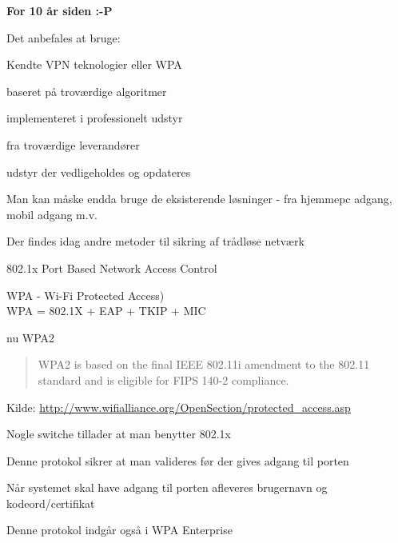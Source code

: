 \documentclass[Screen16to9,17pt]{foils}
\begin{document}
\centerline{\bf For 10 år siden :-P }


\begin{list1}
\item Det anbefales at bruge:
\item Kendte VPN teknologier eller WPA
\item baseret på troværdige algoritmer
\item implementeret i professionelt udstyr
\item fra troværdige leverandører
\item udstyr der vedligeholdes og opdateres
\item Man kan måske endda bruge de eksisterende løsninger - fra
  hjemmepc adgang, mobil adgang m.v.
\end{list1}




\begin{list1}
\item Der findes idag andre metoder til sikring af trådløse netværk
\item 802.1x Port Based Network Access Control
\item WPA - Wi-Fi Protected Access)\\
WPA = 802.1X + EAP + TKIP + MIC
\item nu WPA2
\begin{quote}
WPA2 is based on the final IEEE 802.11i amendment to the 802.11
standard and is eligible for FIPS 140-2 compliance.
\end{quote}
\item Kilde:
\href{http://www.wifialliance.org/OpenSection/protected_access.asp}
{http://www.wifialliance.org/OpenSection/protected\_access.asp}
\end{list1}



\begin{list2}
\item Nogle switche tillader at man benytter 802.1x
\item Denne protokol sikrer at man valideres før der gives adgang til porten
\item Når systemet skal have adgang til porten afleveres brugernavn og kodeord/certifikat
\item Denne protokol indgår også i WPA Enterprise
\end{list2}
\end{document}
